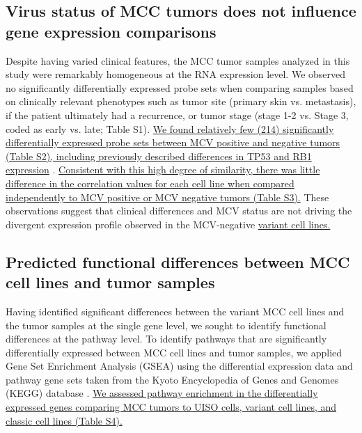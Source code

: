 \documentclass[10pt]{article}
\begin{document}
\subsection*{Virus status of MCC tumors does not influence gene expression comparisons}
Despite having varied clinical features, the MCC tumor samples analyzed in this study were remarkably homogeneous at the RNA expression level.
We observed no significantly differentially expressed probe sets when comparing samples based on clinically relevant phenotypes such as tumor site (primary skin vs. metastasis), if the patient ultimately had a recurrence, or tumor stage (stage 1-2 vs. Stage 3, coded as early vs. late; Table S1).
\uline{We found relatively few (214) significantly differentially expressed probe sets between MCV positive and negative tumors (Table S2), including previously described differences in TP53 and RB1 expression} \citep{Harms2013Distinct,Sihto2011Merkel,Bhatia2010Merkel,Waltari2011Association}.
\uline{Consistent with this high degree of similarity, there was little difference in the correlation values for each cell line when compared independently to MCV positive or MCV negative tumors (Table S3).}
These observations suggest that clinical differences and MCV status are not driving the divergent expression profile observed in the MCV-negative \citep{Guastafierro2013Characterization} \uline{variant cell lines.}

\subsection*{Predicted functional differences between MCC cell lines and tumor samples}
Having identified significant differences between the variant MCC cell lines and the tumor samples at the single gene level, we sought to identify functional differences at the pathway level.
To identify pathways that are significantly differentially expressed between MCC cell lines and tumor samples, we applied Gene Set Enrichment Analysis (GSEA) \citep{Subramanian2005Gene} using the differential expression data and pathway gene sets taken from the Kyoto Encyclopedia of Genes and Genomes (KEGG) database \citep{Kanehisa2000KEGG}.
\uline{We assessed pathway enrichment in the differentially expressed genes comparing MCC tumors to UISO cells, variant cell lines, and classic cell lines (Table S4).}
\end{document}
